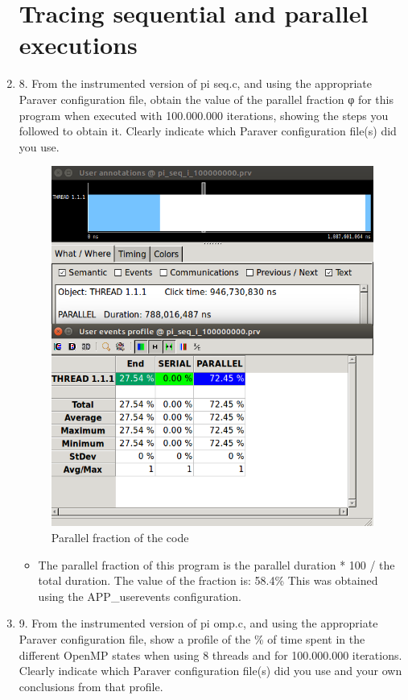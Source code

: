 \documentclass[12pt]{article}
\begin{document}
\begin{enumerate}
\section* {Tracing sequential and parallel executions}


\item[] 8. From the instrumented version of pi seq.c, and using the appropriate Paraver configuration
file, obtain the value of the parallel fraction φ for this program when executed with 100.000.000
iterations, showing the steps you followed to obtain it. Clearly indicate which Paraver configuration
file(s) did you use.

\begin{figure}[H]
\centering
\includegraphics[width=12cm]{ex8.png}
\caption{Parallel fraction of the code}
\label{fig:Parallel duration}%
\end{figure}

\begin{itemize}
	\item[] The parallel fraction of this program is the parallel duration * 100 / the total duration. The value of the fraction is: 58.4\% This was obtained using the APP\_userevents configuration. 
\end{itemize}


\item[] 9. From the instrumented version of pi omp.c, and using the appropriate Paraver configuration file,
show a profile of the \% of time spent in the different OpenMP states when using 8 threads and for
100.000.000 iterations. Clearly indicate which Paraver configuration file(s) did you use and your
own conclusions from that profile.


\end{enumerate}
\end{document}
